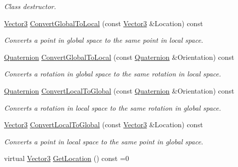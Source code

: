 \begin{DoxyCompactItemize}
\begin{DoxyCompactList}\small\item\em Class destructor. \item\end{DoxyCompactList}\item 
\hyperlink{classMezzanine_1_1Vector3}{Vector3} \hyperlink{classMezzanine_1_1AttachableBase_a33eb528b2e924ef70a9bab7fd79c70d0}{ConvertGlobalToLocal} (const \hyperlink{classMezzanine_1_1Vector3}{Vector3} \&Location) const 
\begin{DoxyCompactList}\small\item\em Converts a point in global space to the same point in local space. \item\end{DoxyCompactList}\item 
\hyperlink{classMezzanine_1_1Quaternion}{Quaternion} \hyperlink{classMezzanine_1_1AttachableBase_a39338b566a38828b8c9b1ddf3e2c865e}{ConvertGlobalToLocal} (const \hyperlink{classMezzanine_1_1Quaternion}{Quaternion} \&Orientation) const 
\begin{DoxyCompactList}\small\item\em Converts a rotation in global space to the same rotation in local space. \item\end{DoxyCompactList}\item 
\hyperlink{classMezzanine_1_1Quaternion}{Quaternion} \hyperlink{classMezzanine_1_1AttachableBase_a709ad287377d07a576ebaca995392e15}{ConvertLocalToGlobal} (const \hyperlink{classMezzanine_1_1Quaternion}{Quaternion} \&Orientation) const 
\begin{DoxyCompactList}\small\item\em Converts a rotation in local space to the same rotation in global space. \item\end{DoxyCompactList}\item 
\hyperlink{classMezzanine_1_1Vector3}{Vector3} \hyperlink{classMezzanine_1_1AttachableBase_ab8a5b6e1379ff5cedb5758c4aafe61ed}{ConvertLocalToGlobal} (const \hyperlink{classMezzanine_1_1Vector3}{Vector3} \&Location) const 
\begin{DoxyCompactList}\small\item\em Converts a point in local space to the same point in global space. \item\end{DoxyCompactList}\item 
virtual \hyperlink{classMezzanine_1_1Vector3}{Vector3} \hyperlink{classMezzanine_1_1AttachableBase_a927f25cb0f2ba3afd289586e7ab0f4e8}{GetLocation} () const =0

\end{DoxyCompactItemize}
